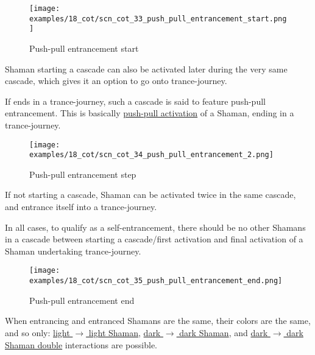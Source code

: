\noindent
\begin{wrapfigure}[9]{l}{0.4\textwidth}
\centering
\texttt{[image: examples/18\_cot/scn\_cot\_33\_push\_pull\_entrancement\_start.png]}
\caption{Push-pull entrancement start}
\label{fig:star/scn_cot_33_push_pull_entrancement_start}
\end{wrapfigure}
Shaman starting a cascade can also be activated later during the very same cascade, which gives it an
option to go onto trance-journey.

If ends in a trance-journey, such a cascade is said to feature push-pull entrancement. This is basically
\hyperref[txt:Miranda's veil/Cascading Waves/Push-pull activation]{push-pull activation} of a Shaman,
ending in a trance-journey.

\vspace*{0.05\textheight}
\noindent
\begin{wrapfigure}[11]{l}{0.4\textwidth}
\centering
\texttt{[image: examples/18\_cot/scn\_cot\_34\_push\_pull\_entrancement\_2.png]}
\caption{Push-pull entrancement step}
\label{fig:star/scn_cot_34_push_pull_entrancement_2}
\end{wrapfigure}
If not starting a cascade, Shaman can be activated twice in the same cascade, and entrance itself
into a trance-journey.

In all cases, to qualify as a self-entrancement, there should be no other Shamans in a cascade
between starting a cascade/first activation and final activation of a Shaman undertaking
trance-journey.

\clearpage %

\noindent
\begin{figure}[!h]
\texttt{[image: examples/18\_cot/scn\_cot\_35\_push\_pull\_entrancement\_end.png]}
\caption{Push-pull entrancement end}
\label{fig:scn_cot_35_push_pull_entrancement_end}
\end{figure}

When entrancing and entranced Shamans are the same, their colors are the same, and so only: \newline
\hyperref[fig:scn_cot_18_light_light_shaman_interaction_start]{light $\rightarrow$ light Shaman}, \newline
\hyperref[fig:scn_cot_22_dark_dark_shaman_interaction_start]{dark $\rightarrow$ dark Shaman}, and \newline
\hyperref[fig:scn_cot_24_dark_dark_shaman_double_interaction_start]{dark $\rightarrow$ dark Shaman double}
interactions are possible.

